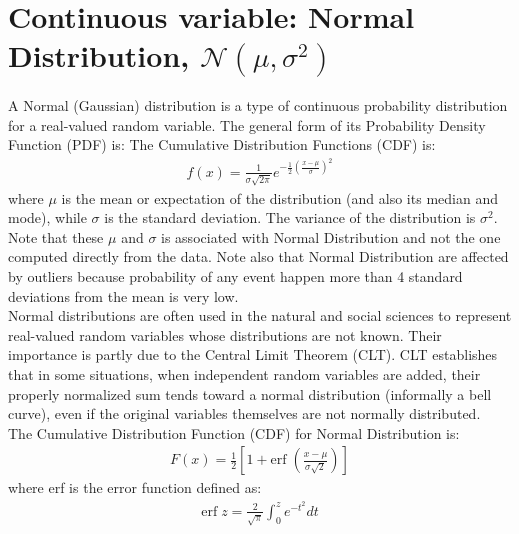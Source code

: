 \section{Continuous variable: Normal Distribution, $\mathcal{N}(\mu, \sigma^2)$}

A Normal (Gaussian) distribution is a type of continuous probability distribution for a real-valued random variable. The general form of its Probability Density Function (PDF) is:
The Cumulative Distribution Functions (CDF) is:
\begin{eqnarray}
f(x) = \frac{1}{\sigma \sqrt{2 \pi}} e^{-\frac{1}{2}(\frac{x-\mu}{\sigma})^2}
\label{normal_pdf}
\end{eqnarray}
where $\mu$ is the mean or expectation of the distribution (and also its median and mode), while $\sigma$ is the standard deviation. The variance of the distribution is $\sigma^2$.  Note that these $\mu$ and $\sigma$ is associated with Normal Distribution and not the one computed directly from the data. Note also that Normal Distribution are affected by outliers because probability of any event happen more than 4 standard deviations from the mean is very low. \\

Normal distributions are often used in the natural and social sciences to represent real-valued random variables whose distributions are not known. Their importance is partly due to the Central Limit Theorem (CLT). CLT establishes that in some situations, when independent random variables are added, their properly normalized sum tends toward a normal distribution (informally a bell curve), even if the original variables themselves are not normally distributed. \\

The Cumulative Distribution Function (CDF) for Normal Distribution is:
\begin{eqnarray}
F(x) = \frac{1}{2}[1 + \text{erf} \; (\frac{x - \mu}{\sigma \sqrt{2}})]
\label{normal_cdf}
\end{eqnarray}
where erf is the error function defined as:
\begin{eqnarray}
\text{erf} \; z = \frac{2}{\sqrt{\pi}} \int^{z}_{0} e^{-t^2} dt
\label{errfunc}
\end{eqnarray}

